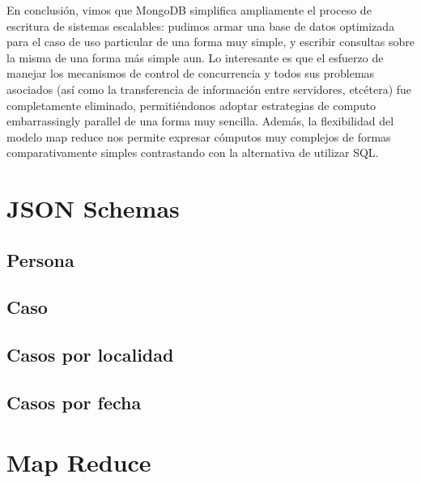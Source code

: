 \documentclass{article}
\theoremstyle{definition}
\theoremstyle{remark}
\begin{document}
En conclusión, vimos que MongoDB simplifica ampliamente el proceso de escritura de sistemas escalables: pudimos armar una base de datos optimizada para el caso de uso particular de una forma muy simple, y escribir consultas sobre la misma de una forma más simple aun. Lo interesante es que el esfuerzo de manejar los mecanismos de control de concurrencia y todos sus problemas asociados (así como la transferencia de información entre servidores, etcétera) fue completamente eliminado, permitiéndonos adoptar estrategias de computo embarrassingly parallel de una forma muy sencilla. Además, la flexibilidad del modelo map reduce nos permite expresar cómputos muy complejos de formas comparativamente simples contrastando con la alternativa de utilizar SQL.

\pagebreak

\section{JSON Schemas}

\subsection{Persona}



\pagebreak

\subsection{Caso}



\pagebreak

\subsection{Casos por localidad}



\subsection{Casos por fecha}



\pagebreak

\section{Map Reduce}


\end{document}
